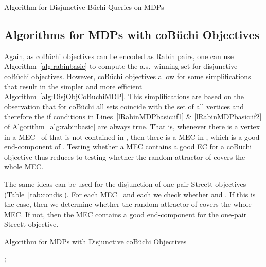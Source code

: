 \documentclass[11pt,letterpaper]{article}
\newcommand{\lu}{\textup{(}}
\newcommand{\ru}{\textup{)}\xspace}
\newcommand{\upbr}[1]{\lu #1\ru}
\begin{document}
\begin{algorithm}
	\caption{Algorithm for Disjunctive Büchi Queries on MDPs}
	\label{alg:DisjQueryBuchiMDP}
	\BlankLine
	\Output
	{
	  
	}
	\BlankLine
	\;
	\For{}{
	  \;
	}
	
	\ForEach{}{
		\For{}{
		    \If{}{
			  \;
		    }	    
		}
	}
	\Return{\;}
\end{algorithm}

\subsection{Algorithms for MDPs with coBüchi Objectives}
\label{sec:cobuchialg}

Again, as coBüchi objectives can be encoded as Rabin pairs, one can use
Algorithm~\ref{alg:rabinbasic} to compute the a.s.~winning set for disjunctive 
coBüchi objectives. 
However, coBüchi objectives allow for some simplifications that result in 
the simpler and more efficient Algorithm~\ref{alg:DisjObjCoBuchiMDP}.
This simplifications are based on the observation that for coBüchi all sets  coincide with the set of all vertices and 
therefore the if conditions in Lines~\ref{lRabinMDPbasic:if1} \& \ref{lRabinMDPbasic:if2} of Algorithm~\ref{alg:rabinbasic} are always true.
That is, whenever there is a vertex in a MEC~ of  that is not contained 
in , then there is a MEC in , which is a good end-component of .
Testing whether a MEC contains a good EC for a coBüchi objective 
 thus reduces to testing 
whether the random attractor of  covers the whole MEC. 

\begin{observation}\label{obs:disjStreett}
The same ideas can be used for the disjunction of one-pair Streett objectives
\upbr{Table~\ref{tab:condis}}. For each MEC~ and each  we check whether
 and . If this is the case,
then we determine whether the random attractor of  covers the whole MEC.
If not, then the MEC contains a good end-component for the one-pair Streett 
objective.
\end{observation}

\begin{algorithm}
	\caption{Algorithm for MDPs with Disjunctive coBüchi Objectives}
	\label{alg:DisjObjCoBuchiMDP}
	\BlankLine
	\Output
	{
	  
	}
	\BlankLine
	;
	\;
	
	\Return{\;}
\end{algorithm}
\end{document}
